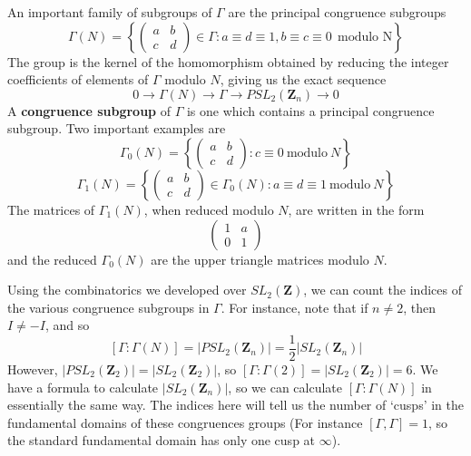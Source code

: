 An important family of subgroups of $\Gamma$ are the principal congruence subgroups
%
\[ \Gamma(N) = \left\{ \begin{pmatrix} a & b \\ c & d \end{pmatrix} \in \Gamma : a \equiv d \equiv 1, b \equiv c \equiv 0\ \ \text{modulo N} \right\} \]
%
The group is the kernel of the homomorphism obtained by reducing the integer coefficients of elements of $\Gamma$ modulo $N$, giving us the exact sequence
%
\[ 0 \to \Gamma(N) \to \Gamma \to PSL_2(\mathbf{Z}_n) \to 0 \]
%
A {\bf congruence subgroup} of $\Gamma$ is one which contains a principal congruence subgroup. Two important examples are
%
\[ \Gamma_0(N) = \left\{ \begin{pmatrix} a & b \\ c & d \end{pmatrix} : c \equiv 0\ \text{modulo}\ N \right\} \]
\[ \Gamma_1(N) = \left\{ \begin{pmatrix} a & b \\ c & d \end{pmatrix} \in \Gamma_0(N) : a \equiv d \equiv 1\ \text{modulo}\ N \right\} \]
%
The matrices of $\Gamma_1(N)$, when reduced modulo $N$, are written in the form
%
\[ \begin{pmatrix} 1 & a \\ 0 & 1 \end{pmatrix} \]
%
and the reduced $\Gamma_0(N)$ are the upper triangle matrices modulo $N$.

Using the combinatorics we developed over $SL_2(\mathbf{Z})$, we can count the indices of the various congruence subgroups in $\Gamma$. For instance, note that if $n \neq 2$, then $I \neq -I$, and so
%
\[ [\Gamma: \Gamma(N)] = |PSL_2(\mathbf{Z}_n)| = \frac{1}{2} |SL_2(\mathbf{Z}_n)| \]
%
However, $|PSL_2(\mathbf{Z}_2)| = |SL_2(\mathbf{Z}_2)|$, so $[\Gamma: \Gamma(2)] = |SL_2(\mathbf{Z}_2)| = 6$. We have a formula to calculate $|SL_2(\mathbf{Z}_n)|$, so we can calculate $[\Gamma: \Gamma(N)]$ in essentially the same way. The indices here will tell us the number of `cusps' in the fundamental domains of these congruences groups (For instance $[\Gamma, \Gamma] = 1$, so the standard fundamental domain has only one cusp at $\infty$).

